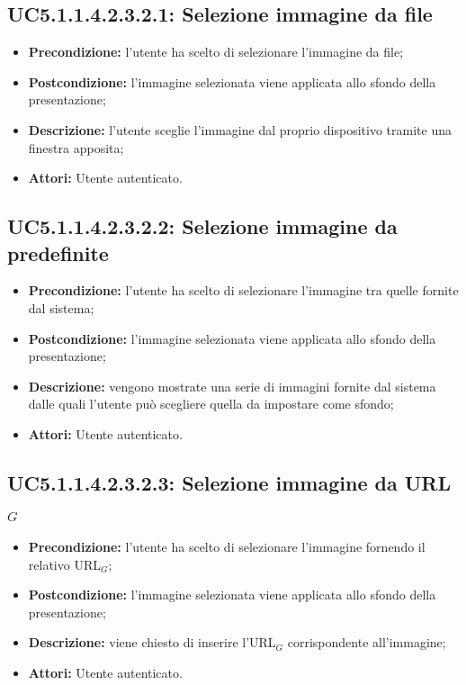 \subsection{ UC5.1.1.4.2.3.2.1: Selezione immagine da file}

\begin{itemize}
	\item \textbf{Precondizione:} l’utente ha scelto di selezionare l’immagine da file;
	\item \textbf{Postcondizione:} l’immagine selezionata viene applicata allo sfondo della presentazione;
	\item \textbf{Descrizione:} l’utente sceglie l’immagine dal proprio dispositivo tramite una finestra apposita;
	\item \textbf{Attori:} Utente autenticato.
\end{itemize}
\subsection{ UC5.1.1.4.2.3.2.2: Selezione immagine da predefinite}

\begin{itemize}
	\item \textbf{Precondizione:} l’utente ha scelto di selezionare l’immagine tra quelle fornite dal sistema;
	\item \textbf{Postcondizione:} l’immagine selezionata viene applicata allo sfondo della presentazione;
	\item \textbf{Descrizione:} vengono mostrate una serie di immagini fornite dal sistema dalle quali l’utente può scegliere quella da impostare come sfondo;
	\item \textbf{Attori:} Utente autenticato.
\end{itemize}
\subsection{ UC5.1.1.4.2.3.2.3: Selezione immagine da URL$_G$}

\begin{itemize}
	\item \textbf{Precondizione:} l’utente ha scelto di selezionare l’immagine fornendo il relativo URL$_G$;
	\item \textbf{Postcondizione:} l’immagine selezionata viene applicata allo sfondo della presentazione;
	\item \textbf{Descrizione:} viene chiesto di inserire l’URL$_G$ corrispondente all’immagine;
	\item \textbf{Attori:} Utente autenticato.
\end{itemize}

